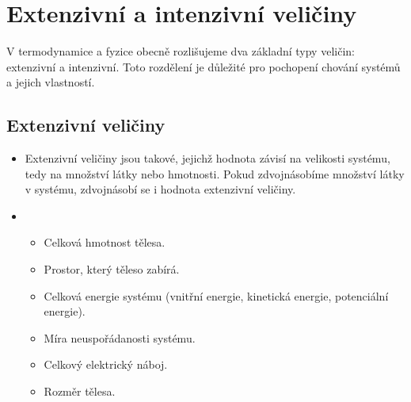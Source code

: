 \documentclass[letterpaper,10pt,english]{jupyterBook}
\begin{document}
\section{Extenzivní a intenzivní veličiny}
\label{\detokenize{Prednasky/0_2_Skal_xe1ry_a_vektory:extenzivni-a-intenzivni-veliciny}}
\sphinxAtStartPar
V termodynamice a fyzice obecně rozlišujeme dva základní typy veličin: extenzivní a intenzivní. Toto rozdělení je důležité pro pochopení chování systémů a jejich vlastností.


\subsection{Extenzivní veličiny}
\label{\detokenize{Prednasky/0_2_Skal_xe1ry_a_vektory:extenzivni-veliciny}}\begin{itemize}
\item {} 
\sphinxAtStartPar
{} Extenzivní veličiny jsou takové, jejichž hodnota závisí na velikosti systému, tedy na množství látky nebo hmotnosti. Pokud zdvojnásobíme množství látky v systému, zdvojnásobí se i hodnota extenzivní veličiny.

\item {} 
\sphinxAtStartPar
{}
\begin{itemize}
\item {} 
\sphinxAtStartPar
{} Celková hmotnost tělesa.

\item {} 
\sphinxAtStartPar
{} Prostor, který těleso zabírá.

\item {} 
\sphinxAtStartPar
{} Celková energie systému (vnitřní energie, kinetická energie, potenciální energie).

\item {} 
\sphinxAtStartPar
{} Míra neuspořádanosti systému.

\item {} 
\sphinxAtStartPar
{} Celkový elektrický náboj.

\item {} 
\sphinxAtStartPar
{} Rozměr tělesa.

\end{itemize}

\end{itemize}
\end{document}
